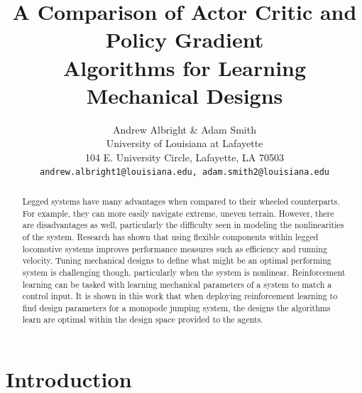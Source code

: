 \documentclass[10pt,twocolumn,letterpaper]{article}
\begin{document}
\title{A Comparison of Actor Critic and Policy Gradient \\ Algorithms for Learning Mechanical Designs}

\author{Andrew Albright \& Adam Smith\\
University of Louisiana at Lafayette\\
104 E. University Circle, Lafayette, LA 70503\\
{\tt\small andrew.albright1@louisiana.edu, adam.smith2@louisiana.edu}
}
\maketitle

\listoftodos

\begin{abstract}
  Legged systems have many advantages when compared to their wheeled counterparts. For example, they can more easily navigate extreme, uneven terrain. However, there are disadvantages as well, particularly the difficulty seen in modeling the nonlinearities of the system. Research has shown that using flexible components within legged locomotive systems improves performance measures such as efficiency and running velocity. Tuning mechanical designs to define what might be an optimal performing system is challenging though, particularly when the system is nonlinear. Reinforcement learning can be tasked with learning mechanical parameters of a system to match a control input. It is shown in this work that when deploying reinforcement learning to find design parameters for a monopode jumping system, the designs the algorithms learn are optimal within the design space provided to the agents.
\end{abstract}

\section{Introduction}
\label{sec:intro}
\end{document}
